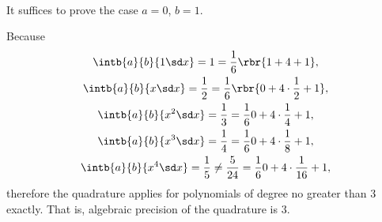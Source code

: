 \documentclass[english, nochinese]{../textmpls/pkupaper}
\begin{document}
\begin{thmquestion}
\ 
\begin{thmproof}
It suffices to prove the case $ a = 0 $, $ b = 1 $.

Because
\begin{gather}
\intb{a}{b}{ 1 \sd x } = 1 = \frac{1}{6} \rbr{ 1 + 4 + 1 }, \\
\intb{a}{b}{ x \sd x } = \frac{1}{2} = \frac{1}{6} \rbr{ 0 + 4 \cdot \frac{1}{2} + 1 }, \\
\intb{a}{b}{ x^2 \sd x } = \frac{1}{3} = \frac{1}{6}{ 0 + 4 \cdot \frac{1}{4} + 1 }, \\
\intb{a}{b}{ x^3 \sd x } = \frac{1}{4} = \frac{1}{6}{ 0 + 4 \cdot \frac{1}{8} + 1 }, \\
\intb{a}{b}{ x^4 \sd x } = \frac{1}{5} \neq \frac{5}{24} = \frac{1}{6}{ 0 + 4 \cdot \frac{1}{16} + 1 },
\end{gather}
therefore the quadrature applies for polynomials of degree no greater than $3$ exactly. That is, algebraic precision of the quadrature is $3$.

\sqed
\end{thmproof}
\end{thmquestion}
\end{document}
